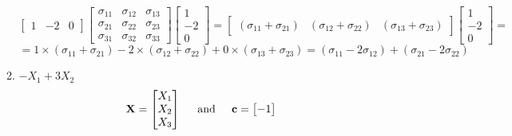 \begin{enumerate}[font=\bfseries]
\begin{enumerate}
\[                \begin{bmatrix}
                    1 & -2 & 0
                \end{bmatrix}
                \begin{bmatrix}
                    \sigma_{11} & \sigma_{12} & \sigma_{13} \\
                    \sigma_{21} & \sigma_{22} & \sigma_{23} \\
                    \sigma_{31} & \sigma_{32} & \sigma_{33}
                \end{bmatrix}
                \begin{bmatrix}
                    1 \\
                    -2 \\
                    0
                \end{bmatrix}
                =
                \begin{bmatrix}
                    \left(\sigma_{11} + \sigma_{21}\right) &
                    \left(\sigma_{12} + \sigma_{22}\right) &
                    \left(\sigma_{13} + \sigma_{23}\right)
                \end{bmatrix}
                \begin{bmatrix}
                    1 \\
                    -2 \\
                    0
                \end{bmatrix}
                =
            \]
            \[
                =
                1 \times \left(\sigma_{11} + \sigma_{21}\right) - 2 \times \left(\sigma_{12} + \sigma_{22}\right)
                    + 0 \times \left(\sigma_{13} + \sigma_{23}\right)
                =
                (\sigma_{11} - 2 \sigma_{12}) + (\sigma_{21} - 2 \sigma_{22})
            \]
            \item $-X_1 + 3X_2$
            \[
                \textbf{X}
                =
                \begin{bmatrix}
                    X_1 \\
                    X_2 \\
                    X_3
                \end{bmatrix}
                \hspace{0.2in}\text{and}\hspace{0.2in}
                \textbf{c}
                =
                \begin{bmatrix}
                    -1 \\

\end{bmatrix}\]
\end{enumerate}
\end{enumerate}
